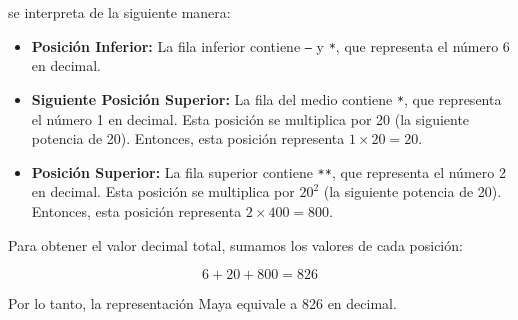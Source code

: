 se interpreta de la siguiente manera:

\begin{itemize}
    \item \textbf{Posición Inferior:} La fila inferior contiene \texttt{---} y \texttt{*}, que representa el número 6 en decimal.
    \item \textbf{Siguiente Posición Superior:} La fila del medio contiene \texttt{*}, que representa el número 1 en decimal. Esta posición se multiplica por 20 (la siguiente potencia de 20). Entonces, esta posición representa $1 \times 20 = 20$.
    \item \textbf{Posición Superior:} La fila superior contiene \texttt{**}, que representa el número 2 en decimal. Esta posición se multiplica por $20^2$ (la siguiente potencia de 20). Entonces, esta posición representa 
    $2 \times 400 = 800$.
\end{itemize}

Para obtener el valor decimal total, sumamos los valores de cada posición:

\[
6 + 20 + 800 = 826
\]

Por lo tanto, la representación Maya equivale a 826 en decimal.
